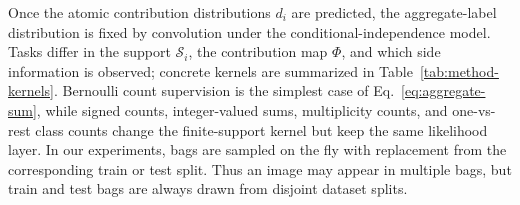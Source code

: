 Once the atomic contribution distributions $d_i$ are predicted, the aggregate-label distribution is fixed by convolution under the conditional-independence model.
Tasks differ in the support $\mathcal{S}_i$, the contribution map $\Phi$, and which side information is observed; concrete kernels are summarized in Table~\ref{tab:method-kernels}.
Bernoulli count supervision is the simplest case of Eq.~\eqref{eq:aggregate-sum}, while signed counts, integer-valued sums, multiplicity counts, and one-vs-rest class counts change the finite-support kernel but keep the same likelihood layer.
In our experiments, bags are sampled on the fly with replacement from the corresponding train or test split.
Thus an image may appear in multiple bags, but train and test bags are always drawn from disjoint dataset splits.

